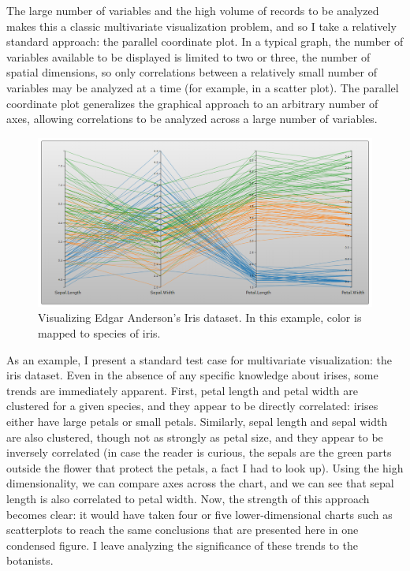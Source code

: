 \documentclass[]{article}
\begin{document}
	The large number of variables and the high volume of records to be analyzed makes this a classic multivariate visualization problem, and so I take a relatively standard approach: the parallel coordinate plot. In a typical graph, the number of variables available to be displayed is limited to two or three, the number of spatial dimensions, so only correlations between a relatively small number of variables may be analyzed at a time (for example, in a scatter plot). The parallel coordinate plot generalizes the graphical approach to an arbitrary number of axes, allowing correlations to be analyzed across a large number of variables.

	\begin{figure}[h]
		\includegraphics[width=\linewidth]{iris.png}
		\caption{Visualizing Edgar Anderson's Iris dataset. In this example, color is mapped to species of iris.}
		\label{fig:Result}
	\end{figure}
	
	\par As an example, I present a standard test case for multivariate visualization: the iris dataset.\cite{datasets} Even in the absence of any specific knowledge about irises, some trends are immediately apparent. First, petal length and petal width are clustered for a given species, and they appear to be directly correlated: irises either have large petals or small petals. Similarly, sepal length and sepal width are also clustered, though not as strongly as petal size, and they appear to be inversely correlated (in case the reader is curious, the sepals are the green parts outside the flower that protect the petals, a fact I had to look up). Using the high dimensionality, we can compare axes across the chart, and we can see that sepal length is also correlated to petal width. Now, the strength of this approach becomes clear: it would have taken four or five lower-dimensional charts such as scatterplots to reach the same conclusions that are presented here in one condensed figure. I leave analyzing the significance of these trends to the botanists.
	
\end{document}
